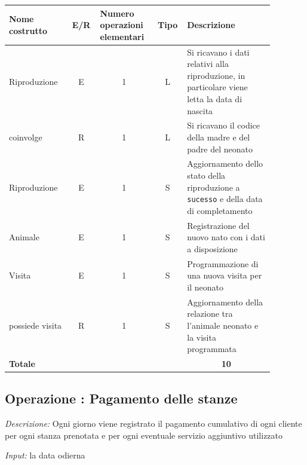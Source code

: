 \documentclass[12pt,a4paper]{article}
\begin{document}
\begin{center}\setlength{\extrarowheight}{1.5pt}\begin{longtable}{|p{0.2\linewidth}|p{0.1\linewidth}|p{0.175\linewidth}|p{0.1\linewidth}|p{0.3\linewidth}|}\hline \textbf{Nome costrutto}   & \multicolumn{1}{|c|}{\textbf{E/R}} & \textbf{Numero operazioni elementari} & \multicolumn{1}{|c|}{\textbf{Tipo}} & \textbf{Descrizione}\\ 
\hline
Riproduzione
 & 
\multicolumn{1}{|c|}{E}
 & 
\multicolumn{1}{|c|}{1}
 & 
\multicolumn{1}{|c|}{L}
 & 
Si ricavano i dati relativi alla riproduzione, in particolare viene letta la data di nascita
\\
\hline
coinvolge
 & 
\multicolumn{1}{|c|}{R}
 & 
\multicolumn{1}{|c|}{1}
 & 
\multicolumn{1}{|c|}{L}
 & 
Si ricavano il codice della madre e del padre del neonato
\\
\hline
Riproduzione
 & 
\multicolumn{1}{|c|}{E}
 & 
\multicolumn{1}{|c|}{1}
 & 
\multicolumn{1}{|c|}{S}
 & 
Aggiornamento dello stato della riproduzione a \texttt{sucesso} e della data di completamento
\\
\hline
Animale
 & 
\multicolumn{1}{|c|}{E}
 & 
\multicolumn{1}{|c|}{1}
 & 
\multicolumn{1}{|c|}{S}
 & 
Registrazione del nuovo nato con i dati a disposizione
\\
\hline
Visita
 & 
\multicolumn{1}{|c|}{E}
 & 
\multicolumn{1}{|c|}{1}
 & 
\multicolumn{1}{|c|}{S}
 & 
Programmazione di una nuova visita per il neonato
\\
\hline
possiede visita
 & 
\multicolumn{1}{|c|}{R}
 & 
\multicolumn{1}{|c|}{1}
 & 
\multicolumn{1}{|c|}{S}
 & 
Aggiornamento della relazione tra l'animale neonato e la visita programmata
\\
\hline
\multicolumn{4}{|l|}{\textbf{Totale}}
 & 
\multicolumn{1}{|c|}{\textbf{10}}
\\
\hline
\end{longtable}\end{center}

\subsection*{Operazione \thecounterAccessi{}: Pagamento delle stanze}
\noindent\textit{Descrizione:} Ogni giorno viene registrato il pagamento cumulativo di ogni cliente per ogni stanza prenotata e per ogni eventuale servizio aggiuntivo utilizzato

\noindent\textit{Input:} la data odierna
\end{document}
